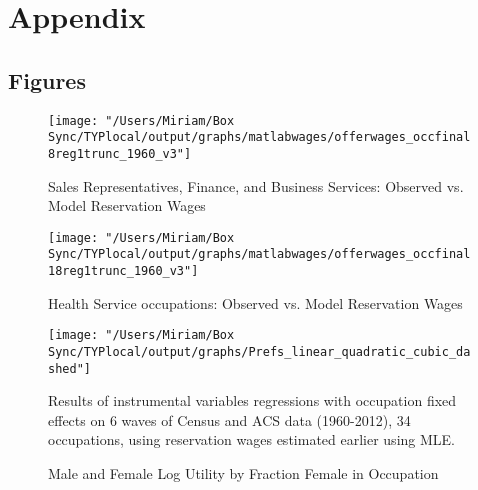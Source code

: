 \documentclass[11pt]{article}
\begin{document}
\newpage

\clearpage

\section{Appendix}


\subsection{Figures}



\begin{figure}[H]
\centering
\caption{Sales Representatives, Finance, and Business Services: Observed vs. Model Reservation Wages}
\label{sales}
\texttt{[image: "/Users/Miriam/Box Sync/TYPlocal/output/graphs/matlabwages/offerwages\_occfinal8reg1trunc\_1960\_v3"]}
\end{figure}

\begin{figure}[H]
\centering
\caption{Health Service occupations: Observed vs. Model Reservation Wages}
\label{health}
\texttt{[image: "/Users/Miriam/Box Sync/TYPlocal/output/graphs/matlabwages/offerwages\_occfinal18reg1trunc\_1960\_v3"]}
\end{figure}

\begin{figure}[H]
\caption{Male and Female Log Utility by Fraction Female in Occupation}
\label{prefs}
\begin{center}
\texttt{[image: "/Users/Miriam/Box Sync/TYPlocal/output/graphs/Prefs\_linear\_quadratic\_cubic\_dashed"]}
\begin{minipage}{.8\textwidth}
\begin{tablenotes}
\footnotesize
\item Results of instrumental variables regressions with occupation fixed effects on 6 waves of Census and ACS data (1960-2012), 34 occupations, using reservation wages estimated earlier using MLE.
\end{tablenotes}
\end{minipage}
\end{center}
\end{figure}
\end{document}
